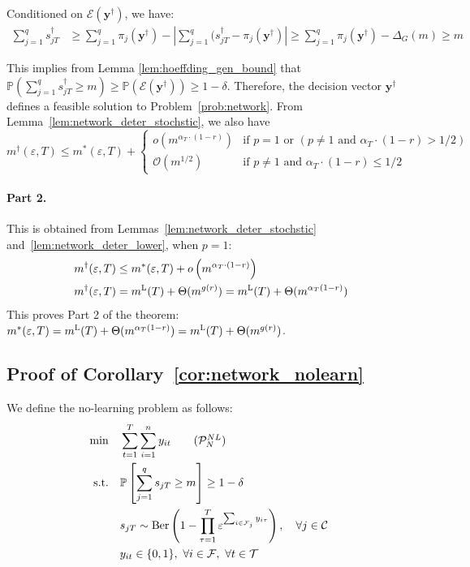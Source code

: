 \documentclass[nonblindrev]{informs3noheader}
\DeclareMathOperator\Ber{Ber}
\def\P{\mathbb{P}}
\def\calC{\mathcal{C}}
\def\calE{\mathcal{E}}
\def\calF{\mathcal{F}}
\def\calO{\mathcal{O}}
\def\calP{\mathcal{P}}
\def\calT{\mathcal{T}}
\def\by{\boldsymbol{y}}
\def\st{\text{s.t.}}
\begin{document}
Conditioned on $\calE(\by^\dagger)$, we have:
\begin{align*}
    \sum_{j=1}^q s^\dagger_{jT}&\geq \sum_{j=1}^q \pi_{j}(\by^\dagger)-\left|\sum_{j=1}^q (s^\dagger_{jT}-\pi_{j}(\by^\dagger)\right|\geq\sum_{j=1}^q \pi_{j}(\by^\dagger)-\Delta_G(m)\geq m
\end{align*}

This implies from Lemma \ref{lem:hoeffding_gen_bound} that $\P\left(\sum_{j=1}^q s^\dagger_{jT}\geq m\right)\geq \P(\calE(\by^\dagger))\geq 1-\delta$. Therefore, the decision vector $\by^\dagger$ defines a feasible solution to Problem~\eqref{prob:network}. From Lemma~\ref{lem:network_deter_stochstic}, we also have
$$m^\dagger(\varepsilon, T)\leq m^*(\varepsilon, T)+\begin{cases}
	o\left(m^{\alpha_T \cdot (1-r)}\right)& \text{if }p=1 \text{ or } (p \neq 1 \text{ and } \alpha_T\cdot(1-r)>1/2)\\
	\calO(m^{1/2}) & \text{if }p \neq 1\text{ and } \alpha_T\cdot(1-r)\leq 1/2        
\end{cases} $$

\paragraph{Part 2.} This is obtained from Lemmas~\ref{lem:network_deter_stochstic} and~\ref{lem:network_deter_lower}, when $p=1$:
\begin{align*}
       & m^\dagger(\varepsilon, T)\leq m^*(\varepsilon, T)+o\left(m^{\alpha_T\cdot(1-r)}\right)\\
       & m^\dagger(\varepsilon, T) =  m^{\textsc{L}}(T) +\Theta(m^{g(r)}) =  m^{\textsc{L}}(T) +\Theta(m^{\alpha_T(1-r)})
\end{align*}
This proves Part 2 of the theorem: $m^*(\varepsilon, T) =  m^{\textsc{L}}(T) +\Theta(m^{\alpha_T(1-r)}) =  m^{\textsc{L}}(T)+\Theta(m^{g(r)})$.
\hfill\Halmos

\subsection{Proof of Corollary~\ref{cor:network_nolearn}}

We define the no-learning problem as follows:
\begin{align}
    \min \quad & \sum_{t=1}^T \sum_{i=1}^n y_{it} \label{prob:network_nolearn}\tag{$\calP_N^{NL}$}\\
    \st\quad&\P\left[\sum_{j=1}^q s_{jT} \geq m\right] \geq 1-\delta \nonumber\\
    \quad& s_{jT}\sim \Ber\left(1-\prod_{\tau=1}^T \varepsilon^{\sum_{i \in \calF_j} y_{i\tau}}\right),\quad \forall j\in\calC\ \nonumber\\
    \quad& y_{it}\in\{0,1\},\ \forall i\in \calF, \ \forall t\in\calT\nonumber
\end{align}
\end{document}
